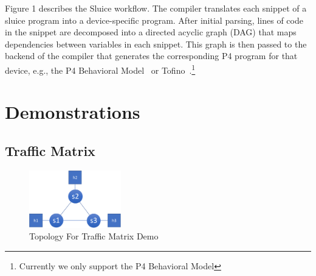 Figure 1 describes the Sluice workflow. The compiler translates each snippet of
a sluice program into a device-specific program. After initial parsing, lines
of code in the snippet are decomposed into a directed acyclic graph (DAG) that
maps dependencies between variables in each snippet. This graph is then passed
to the backend of the compiler that generates the corresponding P4 program for
that device, e.g., the P4 Behavioral Model~\cite{bmv2} or Tofino~\cite{tofino}.\footnote{Currently we only support
the P4 Behavioral Model} 
\vspace{-0.12in}
\section{Demonstrations}
\vspace{-0.05in}
\subsection{Traffic Matrix}
\vspace{-0.03in}

\begin{figure}[tp]
\centering
\includegraphics[width=40mm,scale=0.7]{figures/traf_mat_topo}
\vspace{-0.15in}
\caption{Topology For Traffic Matrix Demo}
\label{fig:tm}
\vspace{-0.15in}
\end{figure}

